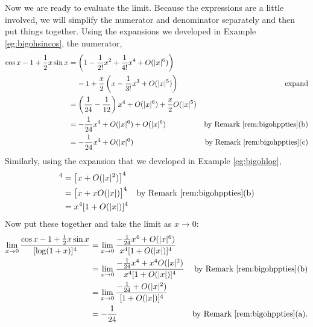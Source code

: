 \begin{eg}
Now we are ready to evaluate the limit. Because the expressions
are a little involved, we will simplify the numerator
and denominator separately and then put things together.
Using the expansions we developed in Example \ref{eg:bigohsincos},
the numerator,
\begin{align*}
  \cos x -1 + \frac{1}{2} x\sin x
  &=
  \left( 1 - \frac{1}{2!}x^2 + \frac{1}{4!}x^4 + O(|x|^6) \right)\\
  &\phantom{=\ } -1  + \frac{x}{2}\left( x - \frac{1}{3!}x^3 + O(|x|^5) \right)
  & \text{expand}
  \\
  &=  \left( \frac{1}{24}-\frac{1}{12} \right)x^4 + O(|x|^6) + \frac{x}{2} O(|x|^5)\\
  &=  - \frac{1}{24}x^4 + O(|x|^6) + O(|x|^6) & \text{by Remark \ref{rem:bigohppties}(b)}\\
  &= - \frac{1}{24}x^4 + O(|x|^6) & \text{by Remark \ref{rem:bigohppties}(c)}
\end{align*}
Similarly, using the expansion that we developed in Example
\ref{eg:bigohlog},
\begin{align*}
  [ \log(1+x) ]^4 &= \big[ x + O(|x|^2) \big]^4 \\
  &= \big[x + x O(|x|)\big]^4 & \text{by Remark \ref{rem:bigohppties}(b)}\\
  &= x^4 [1 +  O(|x|)]^4
\end{align*}
Now put these together and take the limit as $x \to 0$:
\begin{align*}
\lim_{x \to 0}
\frac{\cos x -1 + \tfrac{1}{2} x\sin x}{[\log(1+x)]^4}
&= \lim_{x \to 0}
\frac{ -\frac{1}{24}x^4 + O(|x|^6)}{x^4 [1+O(|x|)]^4} \\
&= \lim_{x \to 0}
\frac{-\frac{1}{24}x^4 + x^4O(|x|^2)}{x^4 [1+O(|x|)]^4}& \text{by Remark \ref{rem:bigohppties}(b)}\\
&= \lim_{x \to 0}
\frac{-\frac{1}{24} + O(|x|^2)}{[1+O(|x|)]^4} \\
&= -\frac{1}{24} & \text{by Remark \ref{rem:bigohppties}(a)}.
\end{align*}
\end{eg}

